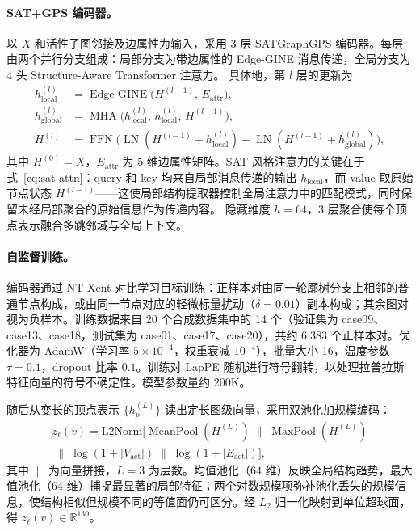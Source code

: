 \documentclass[twocolumn, a4paper, 10pt]{article}
\begin{document}
\paragraph{SAT+GPS 编码器。}以 $X$ 和活性子图邻接及边属性为输入，采用 3 层 SATGraphGPS 编码器。每层由两个并行分支组成：局部分支为带边属性的 Edge-GINE\cite{xu_gin_2019} 消息传递，全局分支为 4 头 Structure-Aware Transformer 注意力。\cite{chen_sat_2022} 具体地，第 $l$ 层的更新为
\begin{align}
h^{(l)}_{\mathrm{local}} &= \operatorname{Edge\text{-}GINE}\bigl(H^{(l-1)},\, E_{\mathrm{attr}}\bigr), \label{eq:edgegine}\\
h^{(l)}_{\mathrm{global}} &= \operatorname{MHA}\bigl(h^{(l)}_{\mathrm{local}},\, h^{(l)}_{\mathrm{local}},\, H^{(l-1)}\bigr), \label{eq:sat-attn}\\
H^{(l)} &= \operatorname{FFN}\bigl(\operatorname{LN}(H^{(l-1)}{+}h^{(l)}_{\mathrm{local}}) + \operatorname{LN}(H^{(l-1)}{+}h^{(l)}_{\mathrm{global}})\bigr), \nonumber
\end{align}
其中 $H^{(0)}{=}X$，$E_{\mathrm{attr}}$ 为 5 维边属性矩阵。SAT 风格注意力的关键在于式~\eqref{eq:sat-attn}：query 和 key 均来自局部消息传递的输出 $h_{\mathrm{local}}$，而 value 取原始节点状态 $H^{(l-1)}$——这使局部结构提取器控制全局注意力中的匹配模式，同时保留未经局部聚合的原始信息作为传递内容。\cite{rampasek_gps_2022} 隐藏维度 $h{=}64$，3 层聚合使每个顶点表示融合多跳邻域与全局上下文。

\paragraph{自监督训练。}编码器通过 NT-Xent\cite{chen_simclr_2020} 对比学习目标训练：正样本对由同一轮廓树分支上相邻的普通节点构成，或由同一节点对应的轻微标量扰动（$\delta{=}0.01$）副本构成；其余图对视为负样本。训练数据来自 20 个合成数据集中的 14 个（验证集为 case09、case13、case18，测试集为 case01、case17、case20），共约 6{,}383 个正样本对。优化器为 AdamW（学习率 $5{\times}10^{-4}$，权重衰减 $10^{-4}$），批量大小 16，温度参数 $\tau{=}0.1$，dropout 比率 $0.1$。训练对 LapPE 随机进行符号翻转，以处理拉普拉斯特征向量的符号不确定性。模型参数量约 200K。

随后从变长的顶点表示 $\{h^{(L)}_p\}$ 读出定长图级向量，采用双池化加规模编码：
\begin{multline}
z_\ell(v)=\mathrm{L2Norm}\bigl[\operatorname{MeanPool}(H^{(L)})\;\|\;\operatorname{MaxPool}(H^{(L)})\\
\;\|\;\log(1{+}|V_{\mathrm{act}}|)\;\|\;\log(1{+}|E_{\mathrm{act}}|)\bigr],
\label{eq:readout}
\end{multline}
其中 $\|$ 为向量拼接，$L{=}3$ 为层数。均值池化（$64$ 维）反映全局结构趋势，最大值池化（$64$ 维）捕捉最显著的局部特征；两个对数规模项弥补池化丢失的规模信息，使结构相似但规模不同的等值面仍可区分。经 $L_2$ 归一化映射到单位超球面，得 $z_\ell(v)\in\mathbb{R}^{130}$。
\end{document}
